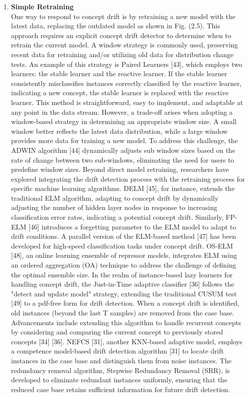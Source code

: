 \begin{enumerate}[label=\Alph*.]
    \item \textbf{Simple Retraining} \\
    One way to respond to concept drift is by retraining a new model with the latest data, replacing the outdated model as shown in Fig. (2.5). This approach requires an explicit concept drift detector to determine when to retrain the current model. A window strategy is commonly used, preserving recent data for retraining and/or utilizing old data for distribution change tests. An example of this strategy is Paired Learners [43], which employs two learners: the stable learner and the reactive learner. If the stable learner consistently misclassifies instances correctly classified by the reactive learner, indicating a new concept, the stable learner is replaced with the reactive learner. This method is straightforward, easy to implement, and adaptable at any point in the data stream.
    However, a trade-off arises when adopting a window-based strategy in determining an appropriate window size. A small window better reflects the latest data distribution, while a large window provides more data for training a new model. To address this challenge, the ADWIN algorithm [44] dynamically adjusts sub window sizes based on the rate of change between two sub-windows, eliminating the need for users to predefine window sizes.
    Beyond direct model retraining, researchers have explored integrating the drift detection process with the retraining process for specific machine learning algorithms. DELM [45], for instance, extends the traditional ELM algorithm, adapting to concept drift by dynamically adjusting the number of hidden layer nodes in response to increasing classification error rates, indicating a potential concept drift.
    Similarly, FP-ELM [46] introduces a forgetting parameter to the ELM model to adapt to drift conditions. A parallel version of the ELM-based method [47] has been developed for high-speed classification tasks under concept drift. OS-ELM [48], an online learning ensemble of repressor models, integrates ELM using an ordered aggregation (OA) technique to address the challenge of defining the optimal ensemble size.
    In the realm of instance-based lazy learners for handling concept drift, the Just-in-Time adaptive classifier [36]  follows the "detect and update model" strategy, extending the traditional CUSUM test [49] to a pdf-free form for drift detection. When a concept drift is identified, old instances (beyond the last T samples) are removed from the case base. Advancements include extending this algorithm to handle recurrent concepts by considering and comparing the current concept to previously stored concepts [34] [36]. NEFCS [31], another KNN-based adaptive model, employs a competence model-based drift detection algorithm [31] to locate drift instances in the case base and distinguish them from noise instances. The redundancy removal algorithm, Stepwise Redundancy Removal (SRR), is developed to eliminate redundant instances uniformly, ensuring that the reduced case base retains sufficient information for future drift detection.
    


\end{enumerate}
